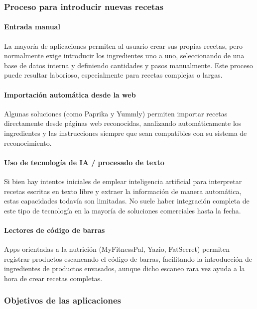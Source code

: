 \subsubsection*{Proceso para introducir nuevas recetas}

\paragraph*{Entrada manual}
La mayoría de aplicaciones permiten al usuario crear sus propias recetas, pero normalmente exige introducir los ingredientes uno a uno, seleccionando de una base de datos interna y definiendo cantidades y pasos manualmente. Este proceso puede resultar laborioso, especialmente para recetas complejas o largas.

\paragraph*{Importación automática desde la web}
Algunas soluciones (como Paprika y Yummly) permiten importar recetas directamente desde páginas web reconocidas, analizando automáticamente los ingredientes y las instrucciones siempre que sean compatibles con su sistema de reconocimiento.

\paragraph*{Uso de tecnología de IA / procesado de texto}
Si bien hay intentos iniciales de emplear inteligencia artificial para interpretar recetas escritas en texto libre y extraer la información de manera automática, estas capacidades todavía son limitadas. No suele haber integración completa de este tipo de tecnología en la mayoría de soluciones comerciales hasta la fecha.

\paragraph*{Lectores de código de barras}
Apps orientadas a la nutrición (MyFitnessPal, Yazio, FatSecret) permiten registrar productos escaneando el código de barras, facilitando la introducción de ingredientes de productos envasados, aunque dicho escaneo rara vez ayuda a la hora de crear recetas completas.

\subsubsection*{Objetivos de las aplicaciones}

